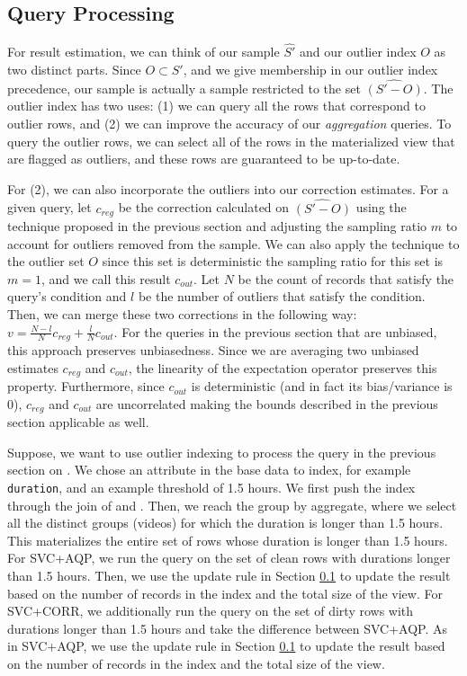 \subsection{Query Processing}\label{oqp} 
For result estimation, we can think of our sample $\hat{S'}$ and our outlier index $O$ as two distinct parts.
Since $O \subset S'$, and we give membership in our outlier index precedence, our sample is actually a sample restricted to the set $\widehat{(S'-O)}$. 
The outlier index has two uses: (1) we can query all the rows that correspond to outlier rows, 
and (2) we can improve the accuracy of our \emph{aggregation} queries.
To query the outlier rows, we can select all of the rows in the materialized view that are flagged as outliers, and these rows are guaranteed to be up-to-date.

For (2), we can also incorporate the outliers into our correction estimates.  
For a given query, let $c_{reg}$ be the correction calculated on $\widehat{(S'-O)}$ using the technique proposed in the previous section and adjusting the sampling ratio $m$ to account for outliers removed from the sample.
We can also apply the technique to the outlier set $O$ since this set is deterministic the sampling ratio for this set is $m=1$, and we call this result $c_{out}$.
Let $N$ be the count of records that satisfy the query's condition and $l$ be the number of outliers that satisfy the condition.
Then, we can merge these two corrections in the following way:
$
 v = \frac{N-l}{N}c_{reg} + \frac{l}{N}c_{out}
$.
For the queries in the previous section that are unbiased, this approach preserves unbiasedness.
Since we are averaging two unbiased estimates $c_{reg}$ and $c_{out}$, the linearity of the expectation operator preserves this property.
Furthermore, since $c_{out}$ is deterministic (and in fact its bias/variance is 0), $c_{reg}$ and $c_{out}$ are uncorrelated making the bounds described in the previous section applicable as well.

\begin{example}
Suppose, we want to use outlier indexing to process the query in the previous section on .
We chose an attribute in the base data to index, for example \texttt{duration}, and an example threshold of 1.5 hours.
We first push the index through the join of  and .
Then, we reach the group by aggregate, where we select all the distinct groups (videos) for which 
the duration is longer than 1.5 hours.
This materializes the entire set of rows whose duration is longer than 1.5 hours.
For SVC+AQP, we run the query on the set of clean rows with durations longer than 1.5 hours.
Then, we use the update rule in Section \ref{oqp} to update the result based on the number of records in the index and the total size of the view.
For SVC+CORR, we additionally run the query on the set of dirty rows with durations longer than 1.5 hours and take the difference between SVC+AQP.
As in SVC+AQP, we use the update rule in Section \ref{oqp} to update the result based on the number of records in the index and the total size of the view.
\end{example}


